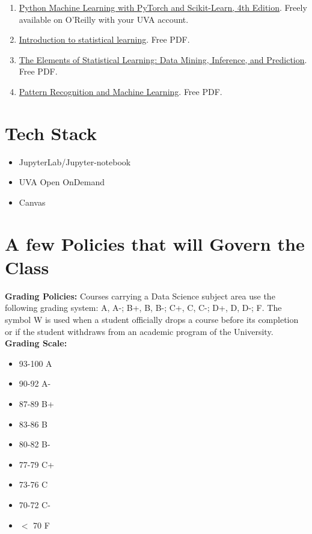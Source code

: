 \documentclass[12pt]{article}
\begin{document}
\begin{enumerate}[label=\Alph*.]
\item  \href{https://sebastianraschka.com/blog/2022/ml-pytorch-book.html}{Python Machine Learning with PyTorch and Scikit-Learn, 4th Edition}. Freely available on O'Reilly with your UVA account. 
\item \href{https://www.statlearning.com/}{Introduction to statistical learning}. Free PDF. 
\item \href{https://hastie.su.domains/ElemStatLearn/}{The Elements of Statistical Learning: Data Mining, Inference, and Prediction}. Free PDF. 
\item \href{https://www.microsoft.com/en-us/research/people/cmbishop/prml-book/}{Pattern Recognition and Machine Learning}. Free PDF.
\end{enumerate}
\section*{Tech Stack}

\begin{itemize}
\item JupyterLab/Jupyter-notebook 
\item UVA Open OnDemand 
\item Canvas
\end{itemize}

\section*{A few Policies that will Govern the Class}

\textbf{Grading Policies:} Courses carrying a Data Science subject area use the following grading system: A, A-; B+, B, B-; C+, C, C-; D+, D, D-; F.  The symbol W is used when a student officially drops a course before its completion or if the student withdraws from an academic program of the University. \\[2pt]

\noindent
\textbf{Grading Scale:}
\begin{itemize}[leftmargin=1.5em]
\item 93-100 A
\item 90-92 A-
\item 87-89 B+
\item 83-86 B
\item 80-82 B-
\item 77-79 C+
\item 73-76 C
\item 70-72 C-
\item $<$ 70 F
\end{itemize}
\end{document}
